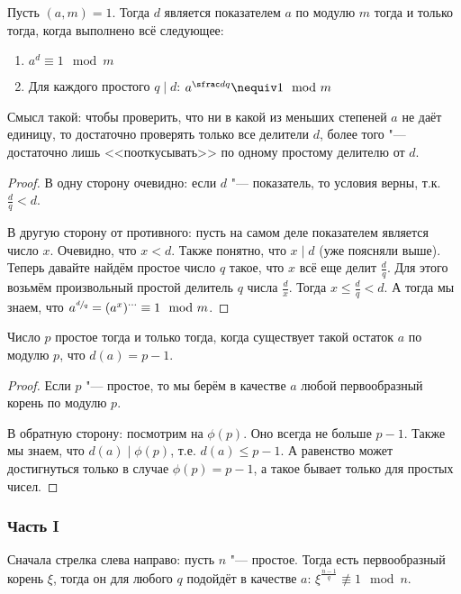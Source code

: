 		\begin{lemma}\label{day160309_criterion_order}
			Пусть $(a, m)=1$.
			Тогда $d$ является показателем $a$ по модулю $m$ тогда и только тогда, когда выполнено всё следующее:
			\begin{enumerate}
				\item $a^d \equiv 1 \mod m$
				\item Для каждого простого $q \mid d$: $a^{\sfrac dq} \nequiv 1 \mod m$
			\end{enumerate}
		\end{lemma}
		\begin{Rem}
			Смысл такой: чтобы проверить, что ни в какой из меньших степеней $a$ не даёт единицу,
			то достаточно проверять только все делители $d$, более того "--- достаточно лишь
			<<пооткусывать>> по одному простому делителю от $d$.
		\end{Rem}
		\begin{proof}
			В одну сторону очевидно: если $d$ "--- показатель, то условия верны,
			т.к. $\frac dq < d$.
	
			В другую сторону от противного: пусть на самом деле показателем является число $x$.
			Очевидно, что $x < d$.
			Также понятно, что $x \mid d$ (уже поясняли выше).
			Теперь давайте найдём простое число $q$ такое, что $x$ всё еще делит $\frac d q$.
			Для этого возьмём произвольный простой делитель $q$ числа $\frac d x$.
			Тогда $x \le \frac d q < d$.
			А тогда мы знаем, что $a^{\sfrac dq} = \left(a^x\right)^{\dots} \equiv 1 \mod m$.
		\end{proof}

		\begin{lemma}
			Число $p$ простое тогда и только тогда, когда существует такой остаток $a$ по модулю $p$,
			что $d(a)=p-1$.
		\end{lemma}
		\begin{proof}
			Если $p$ "--- простое, то мы берём в качестве $a$ любой первообразный корень по модулю $p$.
	
			В обратную сторону: посмотрим на $\phi(p)$.
			Оно всегда не больше $p-1$.
			Также мы знаем, что $d(a)\mid \phi(p)$, т.е. $d(a) \le p-1$.
			А равенство может достигнуться только в случае $\phi(p)=p-1$, а такое бывает только для простых чисел.
		\end{proof}
	
	\subsubsection{Часть I}
		Сначала стрелка слева направо: пусть $n$ "--- простое.
		Тогда есть первообразный корень $\xi$, тогда он для любого $q$
		подойдёт в качестве $a$: $\xi^{\frac{n-1}{q}} \nequiv 1 \mod n$.

